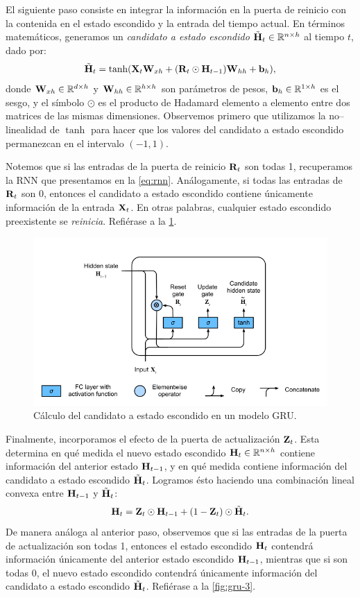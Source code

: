 \documentclass[12pt]{article}
\newcommand{\R}{\mathbb{R}}
\newcommand{\X}{\bm{\textbf X}}
\newcommand{\hi}{\bm{\textbf H}}
\newcommand{\we}{\bm{\textbf W}}
\newcommand{\bi}{\bm{\textbf b}}
\newcommand{\res}{\bm{\textbf R}}
\newcommand{\upd}{\bm{\textbf Z}}
\begin{document}
El siguiente paso consiste en integrar la información en la puerta de reinicio con la contenida en el estado escondido y la entrada del tiempo actual. En términos matemáticos, generamos un \textit{candidato a estado escondido} $ \tilde{\hi}_t \in \R^{n \times h} $ al tiempo $ t $, dado por:
\begin{equation}
    \tilde{\hi}_t = \tanh(\X_t \we_{xh} + (\res_t \odot \hi_{t-1})\we_{hh} + \bi_h),
\end{equation}
donde $ \we_{xh} \in \R^{d \times h} $ y $ \we_{hh} \in \R^{h \times h} $ son parámetros de pesos, $ \bi_h \in \R^{1 \times h} $ es el sesgo, y el símbolo $ \odot $ es el producto de Hadamard elemento a elemento entre dos matrices de las mismas dimensiones. Observemos primero que utilizamos la no--linealidad de $ \tanh $ para hacer que los valores del candidato a estado escondido permanezcan en el intervalo $ (-1, 1) $.

Notemos que si las entradas de la puerta de reinicio $ \res_t $ son todas 1, recuperamos la RNN que presentamos en la \cref{eq:rnn}. Análogamente, si todas las entradas de $ \res_t $ son 0, entonces el candidato a estado escondido contiene únicamente información de la entrada $ \X_t $. En otras palabras, cualquier estado escondido preexistente se \textit{reinicia}. Refiérase a la \cref{fig:gru-2}.

\begin{figure}
    \centering
    \includegraphics[width=0.8\linewidth]{images/gru-2}
    \caption{Cálculo del candidato a estado escondido en un modelo GRU.}
    \label{fig:gru-2}
\end{figure}


Finalmente, incorporamos el efecto de la puerta de actualización $ \upd_t $. Esta determina en qué medida el nuevo estado escondido $ \hi_t \in \R^{n\times h} $ contiene información del anterior estado $ \hi_{t-1} $, y en qué medida contiene información del candidato a estado escondido $ \tilde{\hi}_t $. Logramos ésto haciendo una combinación lineal convexa entre $ \hi_{t-1} $ y $ \tilde{\hi}_t $:
\begin{equation}
    \hi_t = \upd_t \odot \hi_{t-1} + (1 - \upd_t) \odot \tilde{\hi}_t.
\end{equation}
De manera análoga al anterior paso, observemos que si las entradas de la puerta de actualización son todas 1, entonces el estado escondido $ \hi_t $ contendrá información únicamente del anterior estado escondido $ \hi_{t-1} $, mientras que si son todas 0, el nuevo estado escondido contendrá únicamente información del candidato a estado escondido $ \tilde{\hi}_t $. Refiérase a la \cref{fig:gru-3}.
\end{document}
